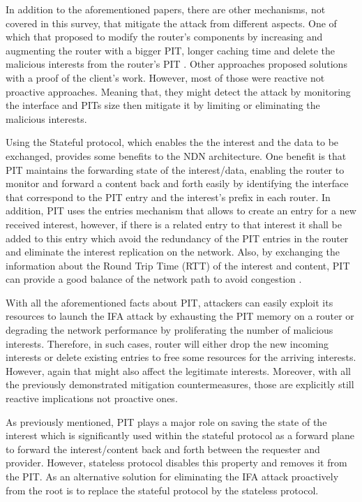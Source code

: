 \documentclass[conference]{IEEEtran}
\begin{document}
In addition to the aforementioned papers, there are other mechanisms, not covered in this survey, that mitigate the attack from different aspects. One of which that proposed to modify the router's components by increasing and augmenting the router with a bigger PIT, longer caching time and delete the malicious interests from the router's PIT \cite{Wang2012}\cite{Virgilio2013}. Other approaches proposed solutions with a proof of the client's work\cite{Li2014}. However, most of those were reactive not proactive approaches. Meaning that, they might detect the attack by monitoring the interface and PITs size then mitigate it by limiting or eliminating the malicious interests.  

Using the Stateful protocol, which enables the the interest and the data to be exchanged, provides some benefits to the NDN architecture. One benefit is that PIT maintains the forwarding state of the interest/data, enabling the router to monitor and forward a content back and forth easily by identifying the interface that correspond to the PIT entry and the interest's prefix in each router. In addition, PIT uses the entries mechanism that allows to create an entry for a new received interest, however, if there is a related entry to that interest it shall be added to this entry which avoid the redundancy of the PIT entries in the router and eliminate the interest replication on the network. Also, by exchanging the information about the Round Trip Time (RTT) of the interest and content, PIT can provide a good balance of the network path to avoid congestion \cite{Yi2012}\cite{Wang2013}.  

With all the aforementioned facts about PIT, attackers can easily exploit its resources to launch the IFA attack by exhausting the PIT memory on a router or degrading the network performance by proliferating the number of malicious interests. Therefore, in such cases, router will either drop the new incoming interests or delete existing entries to free some resources for the arriving interests. However, again that might also affect the legitimate interests. Moreover, with all the previously demonstrated mitigation countermeasures, those are explicitly still reactive implications not proactive ones.      


As previously mentioned, PIT plays a major role on saving the state of the interest which is significantly used within the stateful protocol as a forward plane to forward the interest/content back and forth between the requester and provider. However, stateless protocol disables this property and removes it from the PIT. As an alternative solution for eliminating the IFA attack proactively from the root is to replace the stateful protocol by the stateless protocol.
\end{document}
